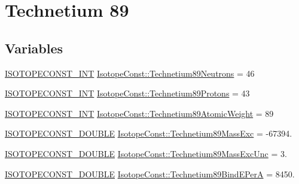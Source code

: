 \hypertarget{group___isotope_const-_technetium-_tc89}{}\section{Technetium 89}
\label{group___isotope_const-_technetium-_tc89}
\subsection*{Variables}
\begin{DoxyCompactItemize}
\item 
\mbox{\hyperlink{group___isotope_const-_macros_ga5f18360b3e99483a35c32d789e62621c}{I\+S\+O\+T\+O\+P\+E\+C\+O\+N\+S\+T\+\_\+\+I\+NT}} \mbox{\hyperlink{group___isotope_const-_technetium-_tc89_ga5056c351baf776c602d0f7dbb5e4c86e}{Isotope\+Const\+::\+Technetium89\+Neutrons}} = 46
\item 
\mbox{\hyperlink{group___isotope_const-_macros_ga5f18360b3e99483a35c32d789e62621c}{I\+S\+O\+T\+O\+P\+E\+C\+O\+N\+S\+T\+\_\+\+I\+NT}} \mbox{\hyperlink{group___isotope_const-_technetium-_tc89_ga3500dfc4f45ffb0ce01446bc738e90ca}{Isotope\+Const\+::\+Technetium89\+Protons}} = 43
\item 
\mbox{\hyperlink{group___isotope_const-_macros_ga5f18360b3e99483a35c32d789e62621c}{I\+S\+O\+T\+O\+P\+E\+C\+O\+N\+S\+T\+\_\+\+I\+NT}} \mbox{\hyperlink{group___isotope_const-_technetium-_tc89_ga0849b4c5f7a0f1ef9ab8a7e21edd4446}{Isotope\+Const\+::\+Technetium89\+Atomic\+Weight}} = 89
\item 
\mbox{\hyperlink{group___isotope_const-_macros_ga8f45a7272ce02c0b4c65c44636ed719a}{I\+S\+O\+T\+O\+P\+E\+C\+O\+N\+S\+T\+\_\+\+D\+O\+U\+B\+LE}} \mbox{\hyperlink{group___isotope_const-_technetium-_tc89_gac53eb578c72a7e962fecb90fe6889876}{Isotope\+Const\+::\+Technetium89\+Mass\+Exc}} = -\/67394.
\item 
\mbox{\hyperlink{group___isotope_const-_macros_ga8f45a7272ce02c0b4c65c44636ed719a}{I\+S\+O\+T\+O\+P\+E\+C\+O\+N\+S\+T\+\_\+\+D\+O\+U\+B\+LE}} \mbox{\hyperlink{group___isotope_const-_technetium-_tc89_ga925129b73fbfa6b11a77c7f7aced7154}{Isotope\+Const\+::\+Technetium89\+Mass\+Exc\+Unc}} = 3.
\item 
\mbox{\hyperlink{group___isotope_const-_macros_ga8f45a7272ce02c0b4c65c44636ed719a}{I\+S\+O\+T\+O\+P\+E\+C\+O\+N\+S\+T\+\_\+\+D\+O\+U\+B\+LE}} \mbox{\hyperlink{group___isotope_const-_technetium-_tc89_ga5145600ec23a2892c899068725aff921}{Isotope\+Const\+::\+Technetium89\+Bind\+E\+PerA}} = 8450.
\item 

\end{DoxyCompactItemize}
